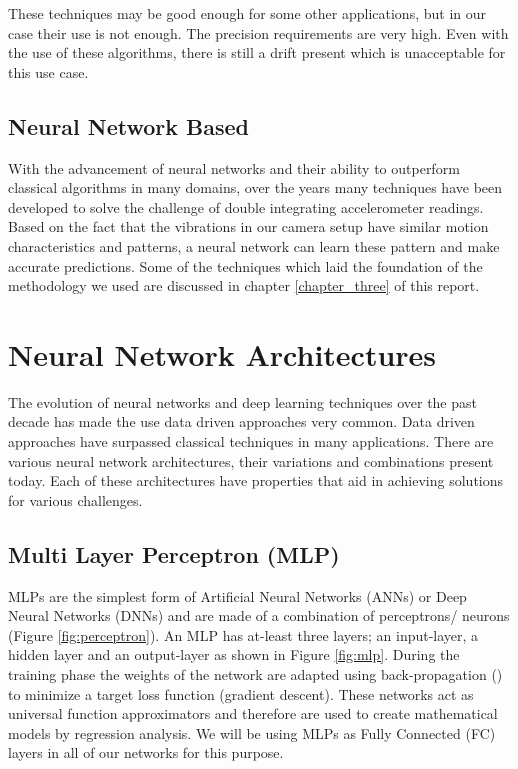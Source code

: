 These techniques may be good enough for some other applications, but in our case their use is not enough. The precision requirements are very high. Even with the use of these algorithms, there is still a drift present which is unacceptable for this use case.

\subsection{Neural Network Based}
With the advancement of neural networks and their ability to outperform classical algorithms in many domains, over the years many techniques have been developed to solve the challenge of double integrating accelerometer readings. Based on the fact that the vibrations in our camera setup have similar motion characteristics and patterns, a neural network can learn these pattern and make accurate predictions. Some of the techniques which laid the foundation of the methodology we used are discussed in chapter \ref{chapter_three} of this report.


\section{Neural Network Architectures}
\label{sec:neural_network}
The evolution of neural networks and deep learning techniques over the past decade has made the use data driven approaches very common. Data driven approaches have surpassed classical techniques in many applications. There are various neural network architectures, their variations and combinations present today. Each of these architectures have properties that aid in achieving solutions for various challenges.

\subsection{Multi Layer Perceptron (MLP)}
MLPs are the simplest form of Artificial Neural Networks (ANNs) or Deep Neural Networks (DNNs) and are made of a combination of perceptrons/ neurons (Figure \ref{fig:perceptron}). An MLP has at-least three layers; an input-layer, a hidden layer and an output-layer as shown in Figure \ref{fig:mlp}. During the training phase the weights of the network are adapted using back-propagation (\citep{rumelhart1986learning}) to minimize a target loss function (gradient descent). These networks act as universal function approximators \citep{cybenko1989approximation} and therefore are used to create mathematical models by regression analysis. We will be using MLPs as Fully Connected (FC) layers in all of our networks for this purpose.

